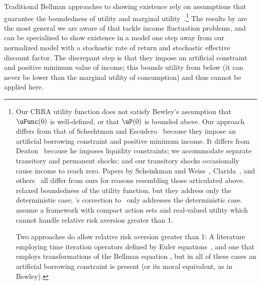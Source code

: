 \documentclass[BufferStockTheory]{subfiles}
\begin{document}
Traditional Bellman approaches to showing existence rely on assumptions that guarantee the boundedness of utility and marginal utility~\citep{slpMethods}.\footnote{Our CRRA utility function does not satisfy Bewley's assumption that $\uFunc(0)$ is well-defined, or that $\uP(0)$ is bounded above. %
  Our approach differs from that of Schechtman and Escudero~\citeyearpar{seIncFluct} because they impose an artificial borrowing constraint and positive minimum income.
  It differs from Deaton~\citeyearpar{deatonLiqConstr} because he imposes liquidity constraints; we accommodate separate transitory and permanent shocks; and our transitory shocks occasionally cause income to reach zero.
  Papers by Scheinkman and Weiss~\citeyearpar{scheinkman&weiss:borrowing}, Clarida~\citep{claridaErgodic}, and others~\cite{cwcUnderUncert} all differ from ours for reasons resembling those articulated above.
  \cite{asHomogeneous} relaxed boundedness of the utility function, but they address only the deterministic case; \cite{mvExistence}'s correction to~\cite{rrExistence} only addresses the deterministic case.
  \cite{mnUnique} assume a framework with compact action sets and real-valued utility which cannot handle relative risk aversion greater than 1. %
  
  Two approaches do allow relative risk aversion greater than 1:  A literature employing time iteration operators defined by Euler equations~\citep{deatonLiqConstr, lsIncFluct, mstIncFluct}, and one that employs transformations of the Bellman equation \citep{rinconZapatero2024}, but in all of these cases an artificial borrowing constraint is present (or its moral equivalent, as in Bewley). %
}
The results by \cite{mstIncFluct,maUnboundedDP} are the most general we are aware of that tackle income fluctuation problems, and can be specialized to show existence in a model one step away from our normalized model with a stochastic rate of return and stochastic effective discount factor. The discrepant step is that they impose an artificial constraint and positive minimum value of income; this bounds utility from below (it can never be lower than the marginal utility of consumption) and thus cannot be applied here.
\end{document}
